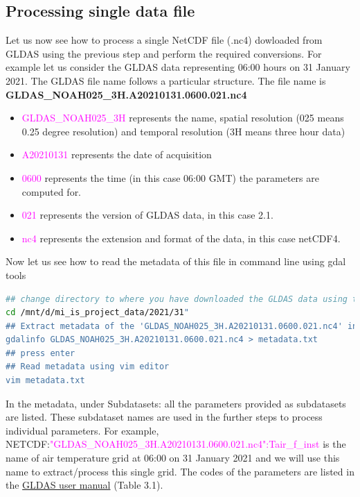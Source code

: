 \subsection{Processing single data file}
Let us now see how to process a single NetCDF file (.nc4) dowloaded from GLDAS using the previous step and perform the required conversions.
For example let us consider the GLDAS data representing 06:00 hours on 31 January 2021.
The GLDAS file name follows a particular structure.
\newline
The file name is \textbf{GLDAS\_NOAH025\_3H.A20210131.0600.021.nc4}
\begin{itemize}
\item \textcolor{magenta}{GLDAS\_NOAH025\_3H} represents the name, spatial resolution (025 means 0.25 degree resolution) and temporal resolution (3H means three hour data)
\item \textcolor{magenta}{A20210131}  represents the date of acquisition
\item \textcolor{magenta}{0600}  represents the time (in this case 06:00 GMT) the parameters are computed for.
\item \textcolor{magenta}{021}  represents the version of GLDAS data, in this case 2.1.
\item \textcolor{magenta}{nc4}  represents the extension and format of the data, in this case netCDF4.
\end{itemize}
Now let us see how to read the metadata of this file in command line using gdal tools
\begin{lstlisting}[language=Bash]
## change directory to where you have downloaded the GLDAS data using the below
cd /mnt/d/mi_is_project_data/2021/31"
## Extract metadata of the 'GLDAS_NOAH025_3H.A20210131.0600.021.nc4' in the file "metadata.txt"
gdalinfo GLDAS_NOAH025_3H.A20210131.0600.021.nc4 > metadata.txt
## press enter
## Read metadata using vim editor
vim metadata.txt
\end{lstlisting}
In the metadata, under Subdatasets: all the parameters provided as subdatasets are listed. 
These subdataset names are used in the further steps to process individual parameters. For example, NETCDF:\textcolor{magenta}{"GLDAS\_NOAH025\_3H.A20210131.0600.021.nc4":Tair\_f\_inst} is the name of air temperature grid at 06:00 on 31 January 2021 and we will use this name to extract/process this single grid. 
The codes of the parameters are listed in the \href{https://hydro1.gesdisc.eosdis.nasa.gov/data/GLDAS/GLDAS_NOAH025_3H.2.1/doc/README_GLDAS2.pdf}{GLDAS user manual} (Table 3.1).
